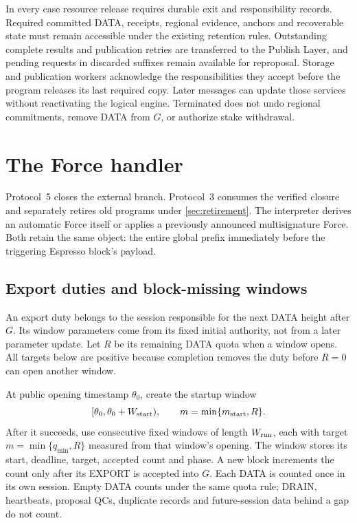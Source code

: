 \documentclass[11pt,a4paper]{article}
\begin{document}
In every case resource release requires durable exit and responsibility
records. Required committed DATA, receipts, regional evidence, anchors
and recoverable state must remain accessible under the existing
retention rules. Outstanding complete results and publication retries
are transferred to the Publish Layer, and pending requests in discarded
suffixes remain available for reproposal. Storage and publication
workers acknowledge the responsibilities they accept before the
program releases its last required copy. Later messages can update
those services without reactivating the logical engine. Terminated
does not undo regional commitments, remove DATA from $G$, or authorize
stake withdrawal.



\section{The Force handler}
\label{sec:force}
Protocol~5 closes the external branch. Protocol~3 consumes the verified
closure and separately retires old programs under \cref{sec:retirement}. The interpreter derives an automatic Force itself
or applies a previously announced multisignature Force.
Both retain the same object: the entire global prefix immediately
before the triggering Espresso block's payload.

\subsection{Export duties and block-missing windows}
\label{sec:windows}
An export duty belongs to the session responsible for the next DATA
height after $G$. Its window parameters come from its fixed initial
authority, not from a later parameter update.
Let $R$ be its remaining DATA quota when a window opens. All targets
below are positive because completion removes the duty before $R=0$
can open another window.

At public opening timestamp $\theta_0$, create the startup window
\[
 [\theta_0,\theta_0+W_{\rm start}),\qquad
 m=\min\{m_{\rm start},R\}.
\]
After it succeeds, use consecutive fixed windows of length
$W_{\rm run}$, each with target $m=\min\{q_{\min},R\}$ measured from
that window's opening. The window stores its start, deadline, target,
accepted count and phase. A new block increments the count only after
its EXPORT is accepted into $G$. Each DATA is counted once in its own
session. Empty DATA counts under the same quota rule; DRAIN, heartbeats,
proposal QCs, duplicate records and future-session data behind a gap
do not count.
\end{document}
